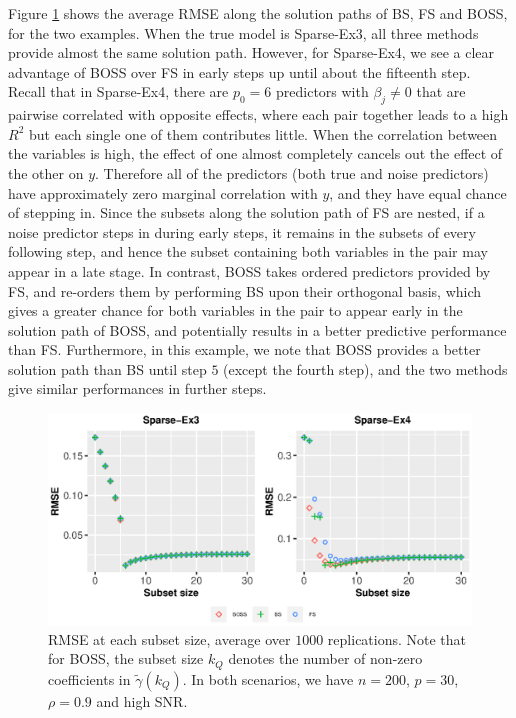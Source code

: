 Figure \ref{fig:lossratio_fs_boss_k} shows the average RMSE along the solution paths of BS, FS and BOSS, for the two examples. When the true model is Sparse-Ex3, all three methods provide almost the same solution path. However, for Sparse-Ex4, we see a clear advantage of BOSS over FS in early steps up until about the fifteenth step. Recall that in Sparse-Ex4, there are $p_0=6$ predictors with $\beta_j \ne 0$ that are pairwise correlated with opposite effects, where each pair together leads to a high $R^2$ but each single one of them contributes little. When the correlation between the variables is high, the effect of one almost completely cancels out the effect of the other on $y$. Therefore all of the predictors (both true and noise predictors) have approximately zero marginal correlation with $y$, and they have equal chance of stepping in. Since the subsets along the solution path of FS are nested, if a noise predictor steps in during early steps, it remains in the subsets of every following step, and hence the subset containing both variables in the pair may appear in a late stage. In contrast, BOSS takes ordered predictors provided by FS, and re-orders them by performing BS upon their orthogonal basis, which gives a greater chance for both variables in the pair to appear early in the solution path of BOSS, and potentially results in a better predictive performance than FS. Furthermore, in this example, we note that BOSS provides a better solution path than BS until step $5$ (except the fourth step), and the two methods give similar performances in further steps.

\begin{figure}[ht!]
	\centering
	\includegraphics[width=\textwidth]{figures/rmse_solpath_lsmethods.eps}
	\caption{RMSE at each subset size, average over $1000$ replications. Note that for BOSS, the subset size $k_Q$ denotes the number of non-zero coefficients in $\tilde{\gamma}(k_Q)$. In both scenarios, we have $n=200$, $p=30$, $\rho=0.9$ and high SNR.}
	\label{fig:lossratio_fs_boss_k}
\end{figure}


